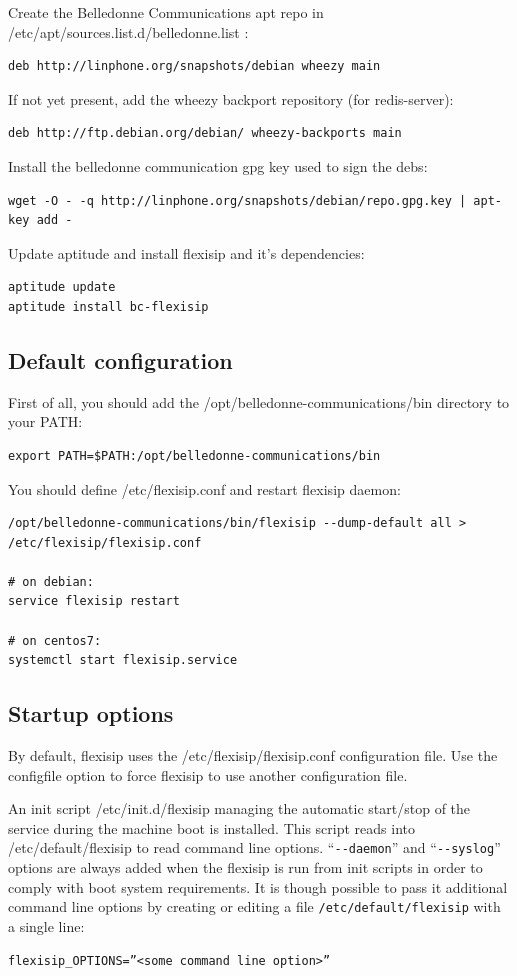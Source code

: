 \documentclass[a4paper,10pt]{article}
\begin{document}
Create the Belledonne Communications apt repo in /etc/apt/sources.list.d/belledonne.list :
\begin{verbatim}
deb http://linphone.org/snapshots/debian wheezy main
\end{verbatim}

If not yet present, add the wheezy backport repository (for redis-server):
\begin{verbatim}
deb http://ftp.debian.org/debian/ wheezy-backports main
\end{verbatim} 

Install the belledonne communication gpg key used to sign the debs:
\begin{verbatim}
wget -O - -q http://linphone.org/snapshots/debian/repo.gpg.key | apt-key add -
\end{verbatim}

Update aptitude and install flexisip and it's dependencies:
\begin{verbatim}
aptitude update
aptitude install bc-flexisip
\end{verbatim}

\subsection{Default configuration}

First of all, you should add the /opt/belledonne-communications/bin directory to your PATH:

\begin{verbatim}
export PATH=$PATH:/opt/belledonne-communications/bin
\end{verbatim}

You should define /etc/flexisip.conf and restart flexisip daemon:
\begin{verbatim}
/opt/belledonne-communications/bin/flexisip --dump-default all > /etc/flexisip/flexisip.conf

# on debian:
service flexisip restart

# on centos7:
systemctl start flexisip.service
\end{verbatim}

\subsection{Startup options}
By default, flexisip uses the /etc/flexisip/flexisip.conf configuration file.
Use the configfile option to force flexisip to use another configuration file.

An init script /etc/init.d/flexisip managing the automatic start/stop of the service during the machine boot is installed.
This script reads into /etc/default/flexisip to read command line options. “\verb|--daemon|” and “\verb|--syslog|” options are always added when the flexisip is run from init scripts in order to comply with boot system requirements.
It is though possible to pass it additional command line options by creating or editing a file \verb|/etc/default/flexisip| with a single line:
\begin{verbatim}
flexisip_OPTIONS=”<some command line option>” 
\end{verbatim}
\end{document}
